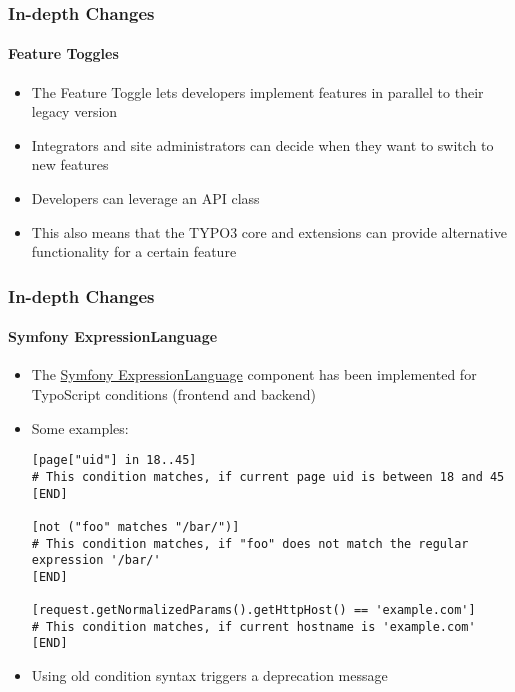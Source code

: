 
\begin{frame}[fragile]
	\frametitle{In-depth Changes}
	\framesubtitle{Feature Toggles}

	\begin{itemize}
		\item The Feature Toggle lets developers implement features in parallel
			to their legacy version
		\item Integrators and site administrators can decide when they want to
			switch to new features
		\item Developers can leverage an API class
		\item This also means that the TYPO3 core and extensions can provide
			alternative functionality for a certain feature
	\end{itemize}

\end{frame}


\begin{frame}[fragile]
	\frametitle{In-depth Changes}
	\framesubtitle{Symfony ExpressionLanguage}

	\lstset{basicstyle=\tiny\ttfamily}

	\begin{itemize}
		\item The \href{https://symfony.com/doc/current/components/expression_language/syntax.html}{Symfony ExpressionLanguage}
			component has been implemented for TypoScript conditions (frontend
			and backend)
		\item Some examples:

\begin{lstlisting}
[page["uid"] in 18..45]
# This condition matches, if current page uid is between 18 and 45
[END]

[not ("foo" matches "/bar/")]
# This condition matches, if "foo" does not match the regular expression '/bar/'
[END]

[request.getNormalizedParams().getHttpHost() == 'example.com']
# This condition matches, if current hostname is 'example.com'
[END]
\end{lstlisting}

		\item Using old condition syntax triggers a deprecation message
	\end{itemize}

\end{frame}

